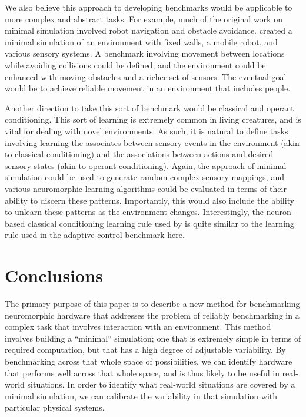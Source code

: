 \documentclass{frontiersSCNS} %
\begin{document}
We also believe this approach to developing benchmarks would be applicable
to more complex and abstract tasks.  For example, much of the original work
on minimal simulation involved robot navigation and obstacle avoidance.  
\cite{Jakobi97evolutonaryrobotics} created a
minimal simulation of an environment with fixed walls, a mobile robot, and
various sensory systems.  A benchmark involving movement between locations
while avoiding collisions could be defined, and the environment could be
enhanced with moving obstacles and a richer set of sensors.  The eventual
goal would be to achieve reliable movement in an environment that includes
people.

Another direction to take this sort of benchmark would be classical and
operant conditioning.  This sort of learning is extremely common in living
creatures, and is vital for dealing with novel environments.  As such,
it is natural to define tasks involving learning the associates between
sensory events in the environment (akin to classical conditioning) and the
associations between actions and desired sensory states (akin to operant
conditioning).  Again, the approach of minimal simulation could be used
to generate random complex sensory mappings, and various neuromorphic
learning algorithms could be evaluated in terms of their ability to
discern these patterns.  Importantly, this would also include the ability
to unlearn these patterns as the environment changes.  Interestingly, the
neuron-based classical conditioning learning rule used by \cite{verschure2003}
is quite similar to the learning rule used in the adaptive control benchmark
here.

\section {Conclusions}

The primary purpose of this paper is to describe a new method for benchmarking
neuromorphic hardware that addresses the problem of reliably benchmarking
in a complex task that involves interaction with an environment.  This
method involves building a ``minimal'' simulation; one that is extremely
simple in terms of required computation, but that has a high degree of
adjustable variability.  By benchmarking across that whole space of
possibilities, we can identify hardware that performs well across that whole
space, and is thus likely to be useful in real-world situations.  In order
to identify what real-world situations are covered by a minimal simulation,
we can calibrate the variability in that simulation with particular physical
systems.
\end{document}
